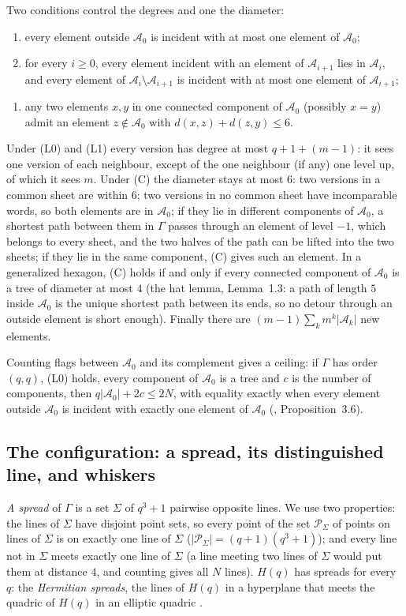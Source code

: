 \documentclass[11pt]{amsart}
\theoremstyle{definition}
\theoremstyle{remark}
\newcommand{\cA}{\mathcal{A}}
\newcommand{\PS}{\mathcal{P}_{\Sigma}}
\begin{document}
Two conditions control the degrees and one the diameter:
\begin{enumerate}[label=\textup{(L\arabic*)},leftmargin=3em,start=0]
\item every element outside $\cA_0$ is incident with at most one element of $\cA_0$;
\item for every $i\ge0$, every element incident with an element of $\cA_{i+1}$ lies in $\cA_i$, and every element of $\cA_i\setminus\cA_{i+1}$ is incident with at most one element of $\cA_{i+1}$;
\end{enumerate}
\begin{enumerate}[label=\textup{(C)},leftmargin=3em]
\item any two elements $x,y$ in one connected component of $\cA_0$ (possibly $x=y$) admit an element $z\notin\cA_0$ with $d(x,z)+d(z,y)\le 6$.
\end{enumerate}
Under (L0) and (L1) every version has degree at most $q+1+(m-1)$: it sees one version of each neighbour, except of the one neighbour (if any) one level up, of which it sees $m$. Under (C) the diameter stays at most $6$: two versions in a common sheet are within $6$; two versions in no common sheet have incomparable words, so both elements are in $\cA_0$; if they lie in different components of $\cA_0$, a shortest path between them in $\Gamma$ passes through an element of level $-1$, which belongs to every sheet, and the two halves of the path can be lifted into the two sheets; if they lie in the same component, (C) gives such an element. In a generalized hexagon, (C) holds if and only if every connected component of $\cA_0$ is a tree of diameter at most $4$ (the hat lemma,  Lemma~1.3: a path of length $5$ inside $\cA_0$ is the unique shortest path between its ends, so no detour through an outside element is short enough). Finally there are $(m-1)\sum_k m^k|\cA_k|$ new elements.

Counting flags between $\cA_0$ and its complement gives a ceiling: if $\Gamma$ has order $(q,q)$, (L0) holds, every component of $\cA_0$ is a tree and $c$ is the number of components, then $q|\cA_0|+2c\le 2N$, with equality exactly when every element outside $\cA_0$ is incident with exactly one element of $\cA_0$ (, Proposition~3.6).

\subsection{The configuration: a spread, its distinguished line, and whiskers}\label{ssec:herm}
\emph{A spread} of $\Gamma$ is a set $\Sigma$ of $q^3+1$ pairwise opposite lines. We use two properties: the lines of $\Sigma$ have disjoint point sets, so every point of the set $\PS$ of points on lines of $\Sigma$ is on exactly one line of $\Sigma$ ($|\PS|=(q+1)(q^3+1)$); and every line not in $\Sigma$ meets exactly one line of $\Sigma$ (a line meeting two lines of $\Sigma$ would put them at distance $4$, and counting gives all $N$ lines). $H(q)$ has spreads for every $q$: the \emph{Hermitian spreads}, the lines of $H(q)$ in a hyperplane that meets the quadric of $H(q)$ in an elliptic quadric \cite{T80}.
\end{document}
